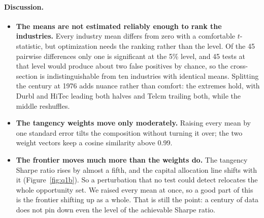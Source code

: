 \documentclass[11pt]{article}
\begin{document}
\paragraph{Discussion.}
\begin{itemize}
\setlength{\itemsep}{6pt}\setlength{\parskip}{0pt}

\item \textbf{The means are not estimated reliably enough to rank the
industries.} Every industry mean differs from zero with a comfortable
$t$-statistic, but optimization needs the ranking rather than the level. Of
the 45 pairwise differences only one is significant at the 5\% level, and 45
tests at that level would produce about two false positives by chance, so the
cross-section is indistinguishable from ten industries with identical means.
Splitting the century at 1976 adds nuance rather than comfort: the extremes
hold, with Durbl and HiTec leading both halves and Telcm trailing both, while
the middle reshuffles.

\item \textbf{The tangency weights move only moderately.} Raising every mean
by one standard error tilts the composition without turning it over; the two
weight vectors keep a cosine similarity above 0.99.

\item \textbf{The frontier moves much more than the weights do.} The tangency
Sharpe ratio rises by almost a fifth, and the capital allocation line shifts
with it (Figure~\ref{fig:q1b}). So a perturbation that no test could detect
relocates the whole opportunity set. We raised every mean at once, so a good
part of this is the frontier shifting up as a whole. That is still the point:
a century of data does not pin down even the level of the achievable Sharpe
ratio.

\end{itemize}
\end{document}
